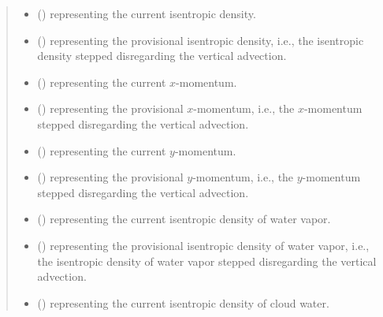 \documentclass[letterpaper,10pt,english]{sphinxmanual}
\begin{document}
\begin{fulllineitems}
\begin{fulllineitems}
\begin{quote}
\begin{description}
\begin{itemize}
\item {} 
 () \textendash{}  representing the current isentropic density.

\item {} 
 () \textendash{}  representing the provisional isentropic density,
i.e., the isentropic density stepped disregarding the vertical advection.

\item {} 
 () \textendash{}  representing the current \(x\)-momentum.

\item {} 
 () \textendash{}  representing the provisional \(x\)-momentum,
i.e., the \(x\)-momentum stepped disregarding the vertical advection.

\item {} 
 () \textendash{}  representing the current \(y\)-momentum.

\item {} 
 () \textendash{}  representing the provisional \(y\)-momentum,
i.e., the \(y\)-momentum stepped disregarding the vertical advection.

\item {} 
 () \textendash{}  representing the current isentropic density of water vapor.

\item {} 
 () \textendash{}  representing the provisional isentropic density of water vapor,
i.e., the isentropic density of water vapor stepped disregarding the vertical advection.

\item {} 
 () \textendash{}  representing the current isentropic density of cloud water.


\end{itemize}
\end{description}
\end{quote}
\end{fulllineitems}
\end{fulllineitems}
\end{document}
